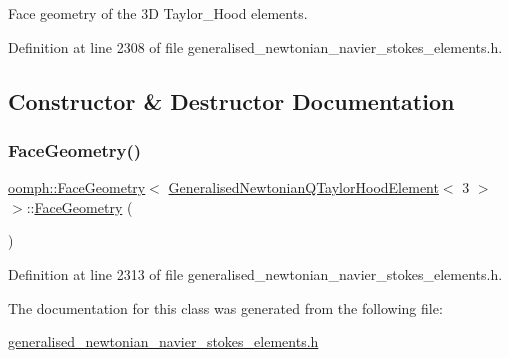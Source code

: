 Face geometry of the 3D Taylor\+\_\+\+Hood elements. 

Definition at line 2308 of file generalised\+\_\+newtonian\+\_\+navier\+\_\+stokes\+\_\+elements.\+h.



\subsection{Constructor \& Destructor Documentation}
\mbox{\label{classoomph_1_1FaceGeometry_3_01GeneralisedNewtonianQTaylorHoodElement_3_013_01_4_01_4_ae9e6562396c778f3f2ab65bba85d50ad}} 
\subsubsection{\texorpdfstring{Face\+Geometry()}{FaceGeometry()}}
{\footnotesize\ttfamily \hyperlink{classoomph_1_1FaceGeometry}{oomph\+::\+Face\+Geometry}$<$ \hyperlink{classoomph_1_1GeneralisedNewtonianQTaylorHoodElement}{Generalised\+Newtonian\+Q\+Taylor\+Hood\+Element}$<$ 3 $>$ $>$\+::\hyperlink{classoomph_1_1FaceGeometry}{Face\+Geometry} (\begin{DoxyParamCaption}{ }\end{DoxyParamCaption})\hspace{0.3cm}{\ttfamily [inline]}}



Definition at line 2313 of file generalised\+\_\+newtonian\+\_\+navier\+\_\+stokes\+\_\+elements.\+h.



The documentation for this class was generated from the following file\+:\begin{DoxyCompactItemize}
\item 
\hyperlink{generalised__newtonian__navier__stokes__elements_8h}{generalised\+\_\+newtonian\+\_\+navier\+\_\+stokes\+\_\+elements.\+h}\end{DoxyCompactItemize}
